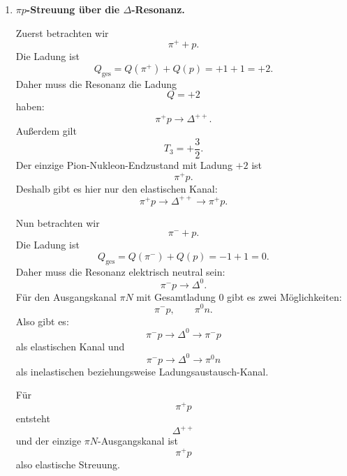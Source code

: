 \documentclass[11pt,a4paper]{scrartcl}
\theoremstyle{definition}
\theoremstyle{plain}
\theoremstyle{remark}
\begin{document}
\begin{enumerate}[label=(\alph*)]
    \begin{answerbox}
        \[
        \boxed{
        \begin{array}{c|c}
        \Delta\text{-Zustand} & (T,T_3)\\
        \hline
        \Delta^{++} & \left(\frac32,+\frac32\right)\\[0.2em]
        \Delta^+ & \left(\frac32,+\frac12\right)\\[0.2em]
        \Delta^0 & \left(\frac32,-\frac12\right)\\[0.2em]
        \Delta^- & \left(\frac32,-\frac32\right)
        \end{array}}
        \]
    \end{answerbox}

    \item \textbf{$\pi p$-Streuung \"uber die $\Delta$-Resonanz.}

    \begin{calculationbox}
        Zuerst betrachten wir
        \[
            \pi^+ + p.
        \]
        Die Ladung ist
        \[
            Q_{\mathrm{ges}}=Q(\pi^+)+Q(p)=+1+1=+2.
        \]
        Daher muss die Resonanz die Ladung
        \[
            Q=+2
        \]
        haben:
        \[
            \pi^+p\to\Delta^{++}.
        \]
        Außerdem gilt
        \[
            T_3=+\frac32.
        \]
        Der einzige Pion-Nukleon-Endzustand mit Ladung $+2$ ist
        \[
            \pi^+p.
        \]
        Deshalb gibt es hier nur den elastischen Kanal:
        \[
            \pi^+p\to\Delta^{++}\to\pi^+p.
        \]
    \end{calculationbox}

    \begin{calculationbox}
        Nun betrachten wir
        \[
            \pi^-+p.
        \]
        Die Ladung ist
        \[
            Q_{\mathrm{ges}}=Q(\pi^-)+Q(p)=-1+1=0.
        \]
        Daher muss die Resonanz elektrisch neutral sein:
        \[
            \pi^-p\to\Delta^0.
        \]
        Für den Ausgangskanal $\pi N$ mit Gesamtladung $0$ gibt es zwei Möglichkeiten:
        \[
            \pi^-p,
            \qquad
            \pi^0 n.
        \]
        Also gibt es:
        \[
            \pi^-p\to\Delta^0\to\pi^-p
        \]
        als elastischen Kanal und
        \[
            \pi^-p\to\Delta^0\to\pi^0n
        \]
        als inelastischen beziehungsweise Ladungsaustausch-Kanal.
    \end{calculationbox}

    \begin{answerbox}
        Für
        \[
            \boxed{\pi^+p}
        \]
        entsteht
        \[
            \boxed{\Delta^{++}}
        \]
        und der einzige $\pi N$-Ausgangskanal ist
        \[
            \boxed{\pi^+p}
        \]
        also elastische Streuung.


\end{answerbox}
\end{enumerate}
\end{document}
